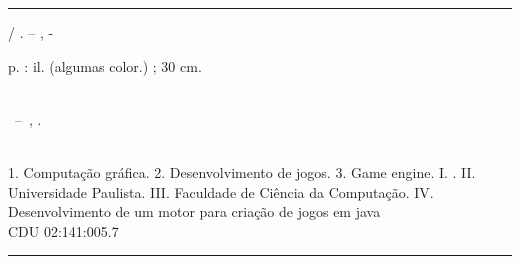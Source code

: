 \documentclass[12pt,	openright, twoside,	a4paper, english, french, spanish, brazil]{abntex2}
\begin{document}
\frenchspacing 


\imprimircapa

\imprimirfolhaderosto*


%
%     
\begin{fichacatalografica}
	\vspace*{\fill}					%
	\hrule							%
	\begin{center}					%
	\begin{minipage}[c]{12.5cm}		%
	
	\imprimirautor
	
	\hspace{0.5cm} \imprimirtitulo  / \imprimirautor. --
	\imprimirlocal, \imprimirdata-
	
	\hspace{0.5cm} \pageref{LastPage} p. : il. (algumas color.) ; 30 cm.\\
	
	\hspace{0.5cm} \imprimirorientadorRotulo~\imprimirorientador\\
	
	\hspace{0.5cm}
	\parbox[t]{\textwidth}{\imprimirtipotrabalho~--~\imprimirinstituicao,
	\imprimirdata.}\\
	
	\hspace{0.5cm}
		1. Computação gráfica.
		2. Desenvolvimento de jogos.
		3. Game engine.
		I. \orientador.
		II. Universidade Paulista.
		III. Faculdade de Ciência da Computação.
		IV. Desenvolvimento de um motor para criação de jogos em java\\ 			
	
	\hspace{8.75cm} CDU 02:141:005.7\\
	
	\end{minipage}
	\end{center}
	\hrule
\end{fichacatalografica}
\end{document}
